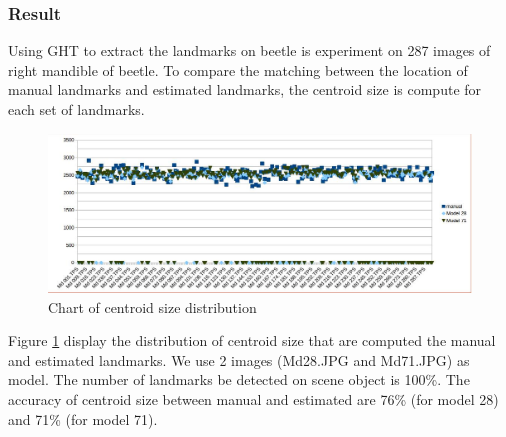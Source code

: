 \subsubsection{Result}
Using GHT to extract the landmarks on beetle is experiment on 287 images of right mandible of beetle. To compare the matching between the location of manual landmarks and estimated landmarks, the centroid size is compute for each set of landmarks.\\[0.2cm]
\begin{figure}[h]
	\centering
	\includegraphics[scale=0.4]{images/chartGHT}
	\caption{Chart of centroid size distribution}
	\label{figcentroidSize}
\end{figure}
Figure \ref{figcentroidSize} display the distribution of centroid size that are computed the manual and estimated landmarks. We use 2 images (Md28.JPG and Md71.JPG) as model. The number of landmarks be detected on scene object is 100\%. The accuracy of centroid size between manual and estimated are 76\% (for model 28) and 71\% (for model 71).
